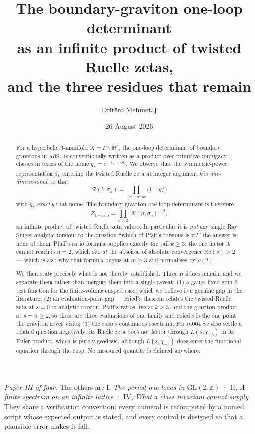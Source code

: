 \documentclass[11pt,a4paper]{article}
\title{The boundary-graviton one-loop determinant\\
as an infinite product of twisted Ruelle zetas,\\
and the three residues that remain}
\author{Drit\"ero Mehmetaj}
\date{26 August 2026}
\theoremstyle{definition}
\theoremstyle{remark}
\newcommand{\HH}{\mathbb{H}}
\newcommand{\Rz}{\mathcal{R}}
\begin{document}
\maketitle

\begin{abstract}
For a hyperbolic $3$-manifold $X=\Gamma\backslash\HH^3$, the one-loop determinant of boundary
gravitons in $\mathrm{AdS}_3$ is conventionally written as a product over primitive conjugacy
classes in terms of the nome $q_\gamma=e^{-\ell_\gamma+i\theta_\gamma}$. We observe that the
symmetric-power representation $\sigma_k$ entering the twisted Ruelle zeta at integer argument
$k$ is \emph{one-dimensional}, so that
\[
   \Rz(k,\sigma_k)=\prod_{[\gamma]\ \mathrm{prime}}\bigl(1-q_\gamma^{\,k}\bigr)
\]
with $q_\gamma$ \emph{exactly} that nome. The boundary-graviton one-loop determinant is
therefore
\[
   Z_{\mathrm{1-loop}}=\prod_{n\ge2}\bigl|\Rz(n,\sigma_n)\bigr|^{-2},
\]
an infinite product of twisted Ruelle zeta values. In particular it is \emph{not} any single
Ray--Singer analytic torsion: to the question ``which of Pfaff's torsions is it?'' the answer is
none of them. Pfaff's ratio formula supplies exactly the tail $k\ge3$; the one factor it cannot
reach is $n=2$, which sits \emph{at} the abscissa of absolute convergence $\mathrm{Re}(s)>2$ ---
which is also why that formula begins at $m\ge3$ and normalises by $\rho(2)$.

We then state precisely what is not thereby established. Three residues remain, and we
separate them rather than merging them into a single caveat: (1) a gauge-fixed spin-$2$ test
function for the finite-volume cusped case, which we believe is a genuine gap in the
literature; (2) an evaluation-point gap --- Fried's theorem relates the twisted Ruelle zeta at
$s=0$ to analytic torsion, Pfaff's ratios live at $k\ge3$, and the graviton product at
$s=n\ge2$, so these are three evaluations of one family and Fried's is the one point the
graviton never visits; (3) the cusp's continuous spectrum. For $m004$ we also settle a related
question negatively: its Ruelle zeta does not factor through $L(s,\chi_{-3})$ in its Euler
product, which is purely geodesic, although $L(s,\chi_{-3})$ does enter the functional equation
through the cusp. No measured quantity is claimed anywhere.
\end{abstract}

\begin{center}\small
\textit{Paper III of four.} The others are I, \emph{The period-one locus in $\mathrm{GL}(2,\mathbb{Z})$} · II, \emph{A finite spectrum on an infinite lattice} · IV, \emph{What a class invariant cannot supply}.
They share a verification convention: every numeral is recomputed by a named script whose
expected output is stated, and every control is designed so that a plausible error makes it fail.
\end{center}
\end{document}
